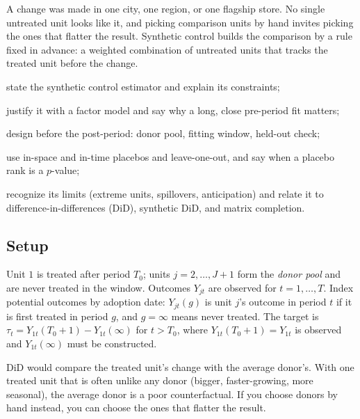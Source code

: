 \documentclass[11pt]{article}
\begin{document}

\begin{decision}
A change was made in one city, one region, or one flagship store. No single untreated unit looks like it, and picking comparison
units by hand invites picking the ones that flatter the result. Synthetic control builds the comparison by a rule fixed in advance:
a weighted combination of untreated units that tracks the treated unit before the change.
\end{decision}

\begin{goals}
  \item state the synthetic control estimator and explain its constraints;
  \item justify it with a factor model and say why a long, close pre-period fit matters;
  \item design before the post-period: donor pool, fitting window, held-out check;
  \item use in-space and in-time placebos and leave-one-out, and say when a placebo rank is a $p$-value;
  \item recognize its limits (extreme units, spillovers, anticipation) and relate it to difference-in-differences (DiD), synthetic DiD, and matrix completion.
\end{goals}

\sectionone

\subsection{Setup}

Unit $1$ is treated after period $T_0$; units $j = 2, \dots, J+1$ form the \emph{donor pool} and are never treated in the window. Outcomes
$Y_{jt}$ are observed for $t = 1, \dots, T$. Index potential outcomes by adoption date: $Y_{jt}(g)$ is unit $j$'s outcome in period $t$ if it is
first treated in period $g$, and $g = \infty$ means never treated. The target is
$\tau_t = Y_{1t}(T_0 + 1) - Y_{1t}(\infty)$ for $t > T_0$, where $Y_{1t}(T_0 + 1) = Y_{1t}$ is observed and $Y_{1t}(\infty)$ must be constructed.

DiD would compare the treated unit's change with the average donor's. With one treated unit that is often unlike any donor (bigger,
faster-growing, more seasonal), the average donor is a poor counterfactual. If you choose donors by hand instead, you can choose the ones
that flatter the result.
\end{document}
